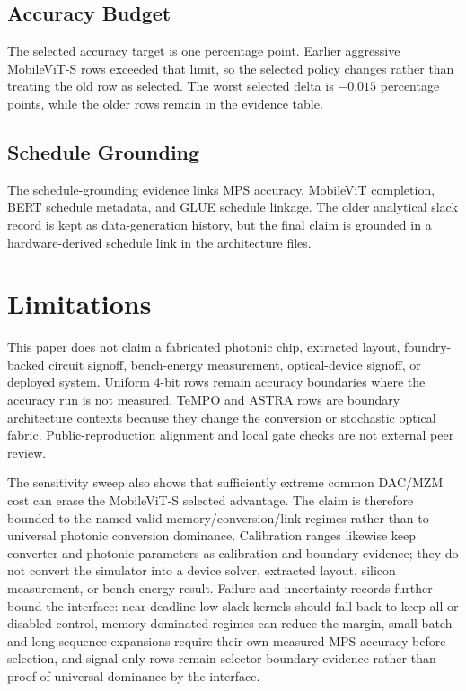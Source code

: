 \documentclass[10pt,journal]{IEEEtran}
\begin{document}
\subsection{Accuracy Budget}

The selected accuracy target is one percentage point. Earlier aggressive
MobileViT-S rows exceeded that limit, so the selected policy changes rather
than treating the old row as selected. The worst selected delta is \(-0.015\)
percentage points, while the older rows remain in the evidence table.

\subsection{Schedule Grounding}

The schedule-grounding evidence links MPS accuracy, MobileViT completion, BERT
schedule metadata, and GLUE schedule linkage. The older analytical slack record
is kept as data-generation history, but the final claim is grounded in a
hardware-derived schedule link in the architecture files.

\section{Limitations}

This paper does not claim a fabricated photonic chip, extracted layout,
foundry-backed circuit signoff, bench-energy measurement, optical-device
signoff, or deployed system. Uniform 4-bit rows remain accuracy boundaries
where the accuracy run is not measured. TeMPO and ASTRA rows are boundary
architecture contexts because they change the conversion or stochastic optical
fabric. Public-reproduction alignment and local gate checks are not external
peer review.

The sensitivity sweep also shows that sufficiently extreme common DAC/MZM cost
can erase the MobileViT-S selected advantage. The claim is therefore bounded to
the named valid memory/conversion/link regimes rather than to universal
photonic conversion dominance. Calibration ranges likewise keep converter and
photonic parameters as calibration and boundary evidence; they do not convert
the simulator into a device solver, extracted layout, silicon measurement, or
bench-energy result. Failure and uncertainty records further bound the
interface: near-deadline low-slack kernels should fall back to keep-all or
disabled control, memory-dominated regimes can reduce the margin, small-batch
and long-sequence expansions require their own measured MPS accuracy before
selection, and signal-only rows remain selector-boundary evidence rather than
proof of universal dominance by the interface.
\end{document}
